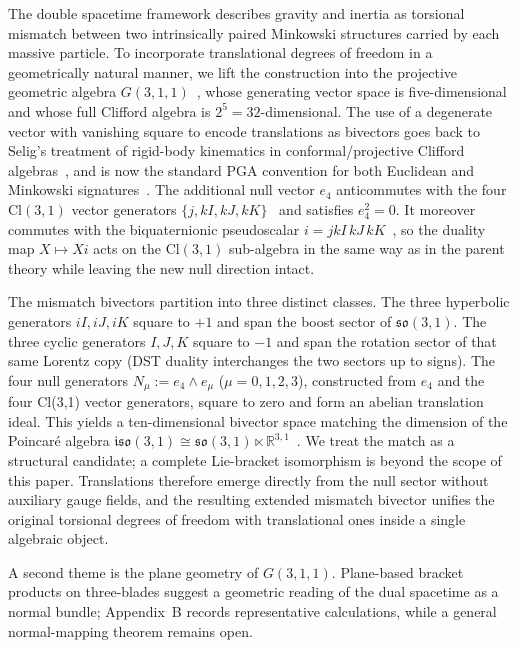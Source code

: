 \documentclass[dvipdfmx,a4paper]{article}
\theoremstyle{definition}
\theoremstyle{plain}
\theoremstyle{remark}
\begin{document}
The double spacetime framework describes gravity and inertia as torsional mismatch between two intrinsically paired Minkowski structures carried by each massive particle. To incorporate translational degrees of freedom in a geometrically natural manner, we lift the construction into the projective geometric algebra \(G(3,1,1)\)~\cite{Gunn2017,Lengyel2024,DeKeninckDorst2019,GunnDeKeninck2020}, whose generating vector space is five-dimensional and whose full Clifford algebra is \(2^{5}=32\)-dimensional. The use of a degenerate vector with vanishing square to encode translations as bivectors goes back to Selig's treatment of rigid-body kinematics in conformal/projective Clifford algebras~\cite{Selig2005}, and is now the standard PGA convention for both Euclidean and Minkowski signatures~\cite{Lengyel2024,GunnDeKeninck2020}. The additional null vector \(e_{4}\) anticommutes with the four \(\mathrm{Cl}(3,1)\) vector generators \(\{j, kI, kJ, kK\}\)~\cite{Hestenes2015,DoranLasenby2003} and satisfies \(e_{4}^{2}=0\). It moreover commutes with the biquaternionic pseudoscalar \(i=jkI\,kJ\,kK\)~\cite{ConwaySmith2003}, so the duality map \(X\mapsto Xi\) acts on the \(\mathrm{Cl}(3,1)\) sub-algebra in the same way as in the parent theory while leaving the new null direction intact.

The mismatch bivectors partition into three distinct classes. The three hyperbolic generators \(iI, iJ, iK\) square to \(+1\) and span the boost sector of \(\mathfrak{so}(3,1)\). The three cyclic generators \(I, J, K\) square to \(-1\) and span the rotation sector of that same Lorentz copy (DST duality interchanges the two sectors up to signs). The four null generators \(N_{\mu} := e_{4}\wedge e_{\mu}\) (\(\mu=0,1,2,3\)), constructed from \(e_{4}\) and the four Cl(3,1) vector generators, square to zero and form an abelian translation ideal. This yields a ten-dimensional bivector space matching the dimension of the Poincar\'{e} algebra \(\mathfrak{iso}(3,1)\cong\mathfrak{so}(3,1)\ltimes\mathbb{R}^{3,1}\)~\cite{Weinberg1995,Tung1985}. We treat the match as a structural candidate; a complete Lie-bracket isomorphism is beyond the scope of this paper. Translations therefore emerge directly from the null sector without auxiliary gauge fields, and the resulting extended mismatch bivector unifies the original torsional degrees of freedom with translational ones inside a single algebraic object.

A second theme is the plane geometry of \(G(3,1,1)\). Plane-based bracket products on three-blades suggest a geometric reading of the dual spacetime as a normal bundle; Appendix~B records representative calculations, while a general normal-mapping theorem remains open.
\end{document}
